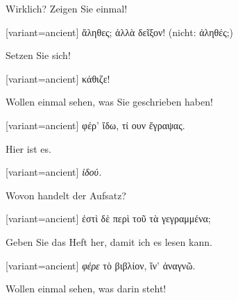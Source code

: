 Wirklich? Zeigen Sie einmal!

\switchcolumn

\begin{greek}[variant=ancient]%
ἄληθες; ἀλλὰ δεῖξον! (\textgerman[spelling=old,babelshorthands=true]{nicht:}
ἀληθές;)

\end{greek}%
\switchcolumn*

Setzen Sie sich!

\switchcolumn

\begin{greek}[variant=ancient]%
κάθιζε!

\end{greek}%
Wollen einmal sehen, was Sie geschrieben haben!

\switchcolumn

\begin{greek}[variant=ancient]%
φέρ' ἴδω, τί ουν ἔγραψας.

\end{greek}%
\switchcolumn*

Hier ist es.

\switchcolumn

\begin{greek}[variant=ancient]%
\emph{ἰδού.}

\end{greek}%
\switchcolumn*

Wovon handelt der Aufsatz?

\switchcolumn

\begin{greek}[variant=ancient]%
ἐστὶ δὲ περὶ τοῦ τὰ γεγραμμένα;

\end{greek}%
\switchcolumn*

Geben Sie das Heft her, damit ich es lesen kann.

\switchcolumn

\begin{greek}[variant=ancient]%
\emph{φέρε} τὸ βιβλίον, ἵν' ἀναγνῶ.

\end{greek}%
\switchcolumn*

Wollen einmal sehen, was darin steht!

